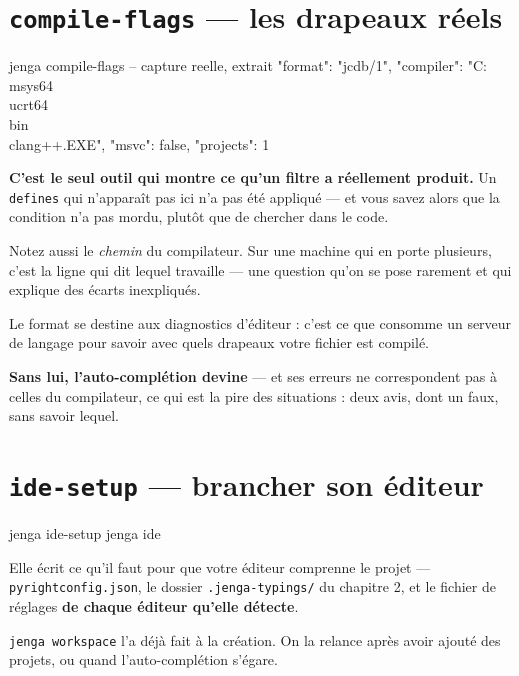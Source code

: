 \section{\texttt{compile-flags} --- les drapeaux réels}

\begin{nkcode}{jenga compile-flags -- capture reelle, extrait}
{"format": "jcdb/1", "compiler": "C:\\msys64\\ucrt64\\bin\\clang++.EXE",
 "msvc": false, "projects": 1}
\end{nkcode}

\begin{nkretenir}
\textbf{C'est le seul outil qui montre ce qu'un filtre a réellement produit.}
Un \texttt{defines} qui n'apparaît pas ici n'a pas été appliqué --- et vous savez
alors que la condition n'a pas mordu, plutôt que de chercher dans le code.

Notez aussi le \emph{chemin} du compilateur. Sur une machine qui en porte
plusieurs, c'est la ligne qui dit lequel travaille --- une question qu'on se pose
rarement et qui explique des écarts inexpliqués.
\end{nkretenir}

\begin{nkretenir}
Le format se destine aux diagnostics d'éditeur : c'est ce que consomme un serveur
de langage pour savoir avec quels drapeaux votre fichier est compilé.

\textbf{Sans lui, l'auto-complétion devine} --- et ses erreurs ne correspondent
pas à celles du compilateur, ce qui est la pire des situations : deux avis, dont
un faux, sans savoir lequel.
\end{nkretenir}

\section{\texttt{ide-setup} --- brancher son éditeur}

\begin{nkcode}{}
jenga ide-setup
jenga ide
\end{nkcode}

\begin{nkretenir}
Elle écrit ce qu'il faut pour que votre éditeur comprenne le projet ---
\texttt{pyrightconfig.json}, le dossier \texttt{.jenga-typings/} du chapitre 2,
et le fichier de réglages \textbf{de chaque éditeur qu'elle détecte}.

\texttt{jenga workspace} l'a déjà fait à la création. On la relance après avoir
ajouté des projets, ou quand l'auto-complétion s'égare.
\end{nkretenir}

